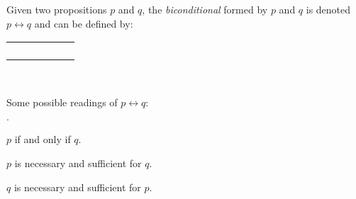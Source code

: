 \begin{definition}
    \begin{minipage}[t]{.55\linewidth}
        Given two propositions $p$ and $q$, the \emph{biconditional} formed by $p$ and $q$
        is denoted $p \leftrightarrow q$ and can be defined by:
        \begin{table}[H]
            \centering
            \label{tab:iff}
            \begin{tabular}{|CcCc||Cc|} \hline
                 &  &  \\ \hline
                \thead{$\top$} & \thead{$\top$} &  \\
                \thead{$\top$} & \thead{$\bot$} &  \\
                \thead{$\bot$} & \thead{$\top$} &  \\
                \thead{$\bot$} & \thead{$\bot$} &  \\ \hline
            \end{tabular}
        \end{table}
    \end{minipage}%
    \begin{minipage}[t]{.05\linewidth}
        ~
    \end{minipage}%
    \begin{minipage}[t]{.4\linewidth}
        Some possible readings of $p \leftrightarrow q$:\\
        \begin{list}{$\cdot$}{}
            \item
                $p$ if and only if $q$.
            \item
                $p$ is necessary and sufficient for $q$.
            \item
                $q$ is necessary and sufficient for $p$.
        \end{list}
    \end{minipage}
\end{definition}

